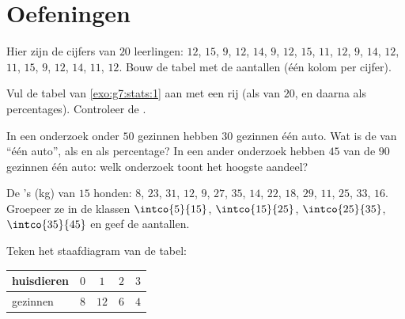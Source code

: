\section{Oefeningen}

\begin{exercise}[$\star$]\label{exo:g7:stats:1}
Hier zijn de cijfers van $20$ leerlingen: $12$, $15$, $9$, $12$, $14$, $9$, $12$,
$15$, $11$, $12$, $9$, $14$, $12$, $11$, $15$, $9$, $12$, $14$, $11$, $12$. Bouw de
tabel met de aantallen (één kolom per cijfer).
\end{exercise}

\begin{exercise}[$\star$]\label{exo:g7:stats:2}
Vul de tabel van \cref{exo:g7:stats:1} aan met een rij  (als  van
$20$, en daarna als percentages). Controleer de .
\end{exercise}

\begin{exercise}[$\star$]\label{exo:g7:stats:3}
In een onderzoek onder $50$ gezinnen hebben $30$ gezinnen één auto. Wat is de
 van ``één auto'', als  en als percentage? In een ander
onderzoek hebben $45$ van de $90$ gezinnen één auto: welk onderzoek toont het
hoogste aandeel?
\end{exercise}

\begin{exercise}[$\star$]\label{exo:g7:stats:4}
De 's (kg) van $15$ honden: $8$, $23$, $31$, $12$, $9$, $27$, $35$, $14$,
$22$, $18$, $29$, $11$, $25$, $33$, $16$. Groepeer ze in de klassen
$\intco{5}{15}$, $\intco{15}{25}$, $\intco{25}{35}$, $\intco{35}{45}$ en geef de
aantallen.
\end{exercise}

\begin{exercise}[$\star$]\label{exo:g7:stats:5}
Teken het staafdiagram van de tabel:
\begin{center}
\renewcommand{\arraystretch}{1.2}
\begin{tabular}{l|cccc}
huisdieren & $0$ & $1$ & $2$ & $3$ \\
\hline
gezinnen & $8$ & $12$ & $6$ & $4$ \\
\end{tabular}
\end{center}
\end{exercise}

